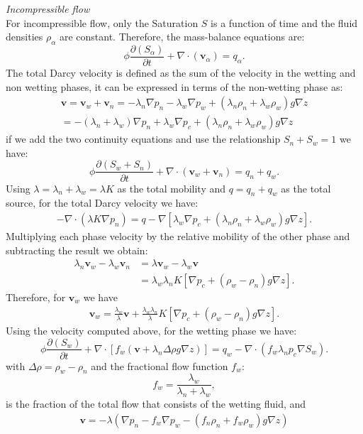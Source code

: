 \documentclass[a4paper,10pt]{report}
\begin{document}
\emph{Incompressible flow}\\
For incompressible flow, only the Saturation $S$ is a function of time and the fluid densities $\rho_{\alpha}$ are constant. Therefore, the mass-balance equations are:
\begin{equation}
 \phi\frac{\partial( {S}_{\alpha})}{\partial t}+\nabla \cdot ( \mathbf{v}_{\alpha})= q_{\alpha}.
\end{equation}
The total Darcy velocity is defined as the sum of the velocity in the wetting and non wetting phases, it can be expressed in terms of the non-wetting phase as:
\begin{align*}
\mathbf{v}=\mathbf{v}_w+\mathbf{v}_n=-\lambda_{n}\nabla p_n-\lambda_{w}\nabla p_w+(\lambda_n \rho_n+\lambda_w\rho_w)g\nabla z\\
=-(\lambda_n+\lambda_w)\nabla p_n+\lambda_w\nabla p_c+(\lambda_n \rho_n+\lambda_w\rho_w)g\nabla z
\end{align*}
if we add the two continuity equations and use the relationship $S_n+S_w=1$ we have:
\begin{equation*}
 \phi\frac{\partial( {S}_{w}+S_n)}{\partial t}+\nabla \cdot ( \mathbf{v}_{w}+\mathbf{v}_n)= q_{n}+q_w.
\end{equation*}
Using $\lambda=\lambda_n+\lambda_w=\lambda K$ as the total mobility and $q=q_n+q_w$ as the total source, for the total Darcy velocity we have:
\begin{align*}
-\nabla \cdot (\lambda K\nabla p_n)=q-\nabla[\lambda_w\nabla p_c+(\lambda_n\rho_n+\lambda_w\rho_w)g\nabla z].
\end{align*}
Multiplying each phase velocity by the relative mobility of the other phase and subtracting the result we obtain:
\begin{align*}
\lambda_n\mathbf{v}_w-\lambda_w\mathbf{v}_n&=\lambda\mathbf{v}_w-\lambda_w\mathbf{v}\\
&=\lambda_w\lambda_n K[\nabla p_c+(\rho_w-\rho_n)g\nabla z].
\end{align*}
Therefore, for $\mathbf{v}_w$ we have
\begin{align*}
\mathbf{v}_w=\frac{\lambda_w}{\lambda}\mathbf{v}+\frac{\lambda_w\lambda_n}{\lambda} K[\nabla p_c+(\rho_w-\rho_n)g\nabla z].
\end{align*}
Using the velocity computed above, for the wetting phase we have:
\begin{equation}\label{eq:sat}
 \phi\frac{\partial( {S}_{w})}{\partial t}+\nabla \cdot [f_w( \mathbf{v}+\lambda_n\Delta  \rho g\nabla z)]= q_w-\nabla \cdot(f_w\lambda_np_c\nabla S_w).
\end{equation}
with $\Delta \rho= \rho_w-\rho_n$ and the fractional flow function $f_w$:
$$f_w=\frac{\lambda_{w}}{\lambda_n+\lambda_w},$$
is the fraction of the total flow that consists of the wetting fluid, and
\begin{align*}
\mathbf{v}=-\lambda(\nabla p_n-f_w\nabla p_w-(f_n \rho_n+f_w\rho_w)g\nabla z)\\
\end{align*}
\end{document}
